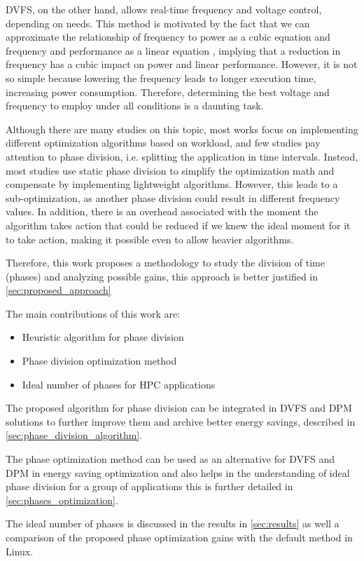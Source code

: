 DVFS, on the other hand, allows real-time frequency and voltage control, depending on needs. This method is motivated by the fact that we can approximate the relationship of frequency to power as a cubic equation and frequency and performance as a linear equation \cite{Dayarathna2016DataSurvey, Group2012HandbookSahni}, implying that a reduction in frequency has a cubic impact on power and linear performance. However, it is not so simple because lowering the frequency leads to longer execution time, increasing power consumption. Therefore, determining the best voltage and frequency to employ under all conditions is a daunting task.

Although there are many studies on this topic, most works focus on implementing different optimization algorithms based on workload, and few studies pay attention to phase division, i.e. splitting the application in time intervals. Instead, most studies use static phase division to simplify the optimization math and compensate by implementing lightweight algorithms. However, this leads to a sub-optimization, as another phase division could result in different frequency values. In addition, there is an overhead associated with the moment the algorithm takes action that could be reduced if we knew the ideal moment for it to take action, making it possible even to allow heavier algorithms.

Therefore, this work proposes a methodology to study the division of time (phases) and analyzing possible gains, this approach is better justified in \cref{sec:proposed_approach}

The main contributions of this work are:
\begin{itemize}
	\item Heuristic algorithm for phase division
	\item Phase division optimization method
	\item Ideal number of phases for HPC applications
\end{itemize}
The proposed algorithm for phase division can be integrated in DVFS and DPM solutions to further improve them and archive better energy savings, described in \cref{sec:phase_division_algorithm}.

The phase optimization method can be used as an alternative for DVFS and DPM in energy saving optimization and also helps in the understanding of ideal phase division for a group of applications this is further detailed in \cref{sec:phases_optimization}.

The ideal number of phases is discussed in the results in \cref{sec:results} as well a comparison of the proposed phase optimization gains with the default method in Linux.

